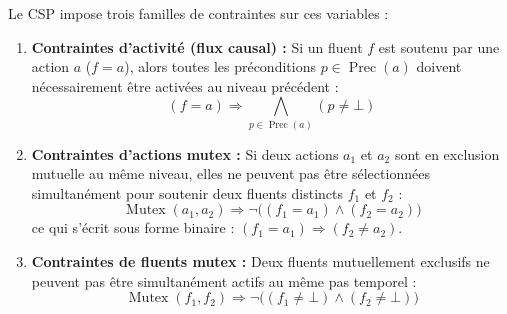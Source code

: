 \begin{proposition}[Contraintes]
    Le CSP impose trois familles de contraintes sur ces variables :
    \begin{enumerate}
        \item \textbf{Contraintes d'activité (flux causal) :} Si un fluent $f$ est soutenu par une action $a$ ($f = a$), alors toutes les préconditions $p \in \operatorname{Prec}(a)$ doivent nécessairement être activées au niveau précédent :
        \begin{equation}
            (f = a) \Longrightarrow \bigwedge_{p \in \operatorname{Prec}(a)} (p \neq \bot)
        \end{equation}
        \item \textbf{Contraintes d'actions mutex :} Si deux actions $a_1$ et $a_2$ sont en exclusion mutuelle au même niveau, elles ne peuvent pas être sélectionnées simultanément pour soutenir deux fluents distincts $f_1$ et $f_2$ :
        \begin{equation}
            \operatorname{Mutex}(a_1, a_2) \Longrightarrow \neg \big( (f_1 = a_1) \land (f_2 = a_2) \big)
        \end{equation}
        ce qui s'écrit sous forme binaire : $(f_1 = a_1) \Longrightarrow (f_2 \neq a_2)$.
        \item \textbf{Contraintes de fluents mutex :} Deux fluents mutuellement exclusifs ne peuvent pas être simultanément actifs au même pas temporel :
        \begin{equation}
            \operatorname{Mutex}(f_1, f_2) \Longrightarrow \neg \big( (f_1 \neq \bot) \land (f_2 \neq \bot) \big)
        \end{equation}
    \end{enumerate}
\end{proposition}

